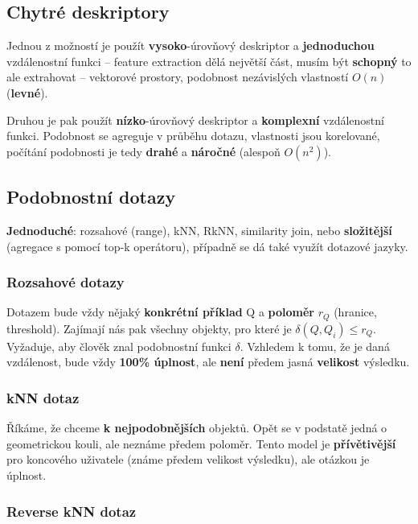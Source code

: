 \subsection{Chytré deskriptory}

Jednou z možností je použít \textbf{vysoko}-úrovňový deskriptor a \textbf{jednoduchou} vzdá\-lenostní funkci -- feature extraction dělá největší část, musím být \textbf{schopný} to ale extrahovat -- vektorové prostory, podobnost nezávislých vlastností $O(n)$ (\textbf{levné}).

Druhou je pak použít \textbf{nízko}-úrovňový deskriptor a \textbf{komplexní} vzdálenostní funkci. Podobnost se agreguje v průběhu dotazu, vlastnosti jsou korelované, počítání podobnosti je tedy \textbf{drahé} a \textbf{náročné} (alespoň $O(n^2)$).

\subsection{Podobnostní dotazy}

\textbf{Jednoduché}: rozsahové (range), kNN, RkNN, similarity join, nebo \textbf{složitější} (agregace s pomocí top-k operátoru), případně se dá také využít dotazové jazyky.

\subsubsection{Rozsahové dotazy}

Dotazem bude vždy nějaký \textbf{konkrétní příklad} Q a \textbf{poloměr} $r_Q$ (hranice, threshold). Zajímají nás pak všechny objekty, pro které je $\delta(Q,Q_i) \leq r_Q$. Vyžaduje, aby člověk znal podobnostní funkci $\delta$. Vzhledem k tomu, že je daná vzdálenost, bude vždy \textbf{100\% úplnost}, ale \textbf{není} předem jasná \textbf{velikost} výsledku.

\subsubsection{kNN dotaz}

Říkáme, že chceme \textbf{k nejpodobnějších} objektů. Opět se v podstatě jedná o geometrickou kouli, ale neznáme předem poloměr. Tento model je \textbf{přívětivější} pro koncového uživatele (známe předem velikost výsledku), ale otázkou je úplnost.

\subsubsection{Reverse kNN dotaz}

